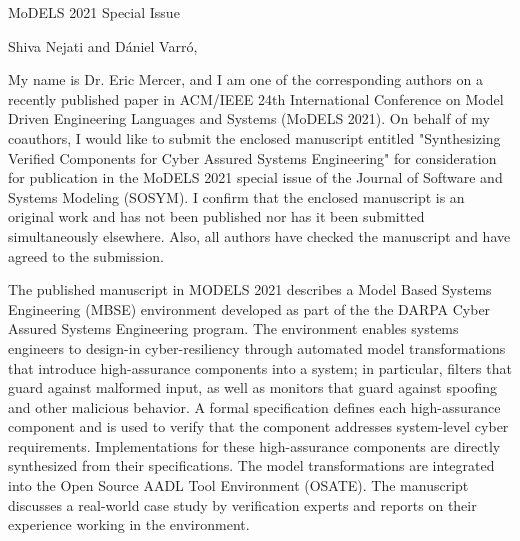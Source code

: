 \documentclass[10pt]{byu-cs}
\begin{document}
\pagestyle{headings}

\signature{Eric G Mercer\\
           Associate Professor}

\begin{letter}{MoDELS 2021 Special Issue}

\date{\today}

\opening{Shiva Nejati and D\'{a}niel Varr\'{o},}

My name is Dr. Eric Mercer, and I am one of the corresponding authors on a recently published paper in ACM/IEEE 24th International Conference on Model Driven Engineering Languages and Systems (MoDELS 2021).
On behalf of my coauthors, I would like to submit the enclosed manuscript entitled "Synthesizing Verified Components for Cyber Assured Systems Engineering" for consideration for publication in the MoDELS 2021 special issue of the Journal of Software and Systems Modeling (SOSYM). 
I confirm that the enclosed manuscript is an original work and has not been published nor has it been submitted simultaneously elsewhere. 
Also, all authors have checked the manuscript and have agreed to the submission.

The published manuscript in MODELS 2021 describes a Model Based Systems Engineering (MBSE) environment developed as part of the the DARPA Cyber Assured Systems Engineering program.
The environment enables systems engineers to design-in cyber-resiliency through automated model transformations that introduce high-assurance components into a system; in particular, filters that guard against
malformed input, as well as monitors that guard against spoofing and other malicious behavior.  
A formal specification defines each high-assurance component and is used to verify that the component addresses system-level cyber requirements.
Implementations for these high-assurance components are directly synthesized from their specifications.  
The model transformations are integrated into the Open Source AADL Tool Environment (OSATE).
The manuscript discusses a real-world case study by verification experts and reports on their experience working in the environment.


\end{letter}
\end{document}
